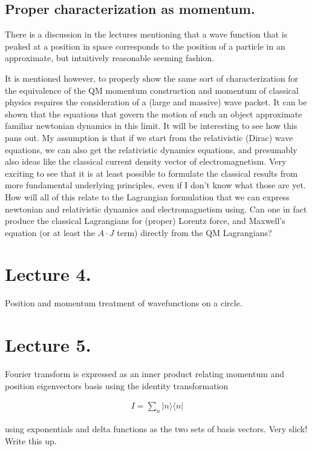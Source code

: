 \documentclass{article}
\newcommand{\ket}[1]{\lvert {#1} \rangle}
\newcommand{\bra}[1]{\langle {#1} \rvert}
\newcommand{\ketbra}[2]{\ket{#1}\bra{#2}}
\begin{document}
\subsection{ Proper characterization as momentum. }

There is a discussion in the lectures mentioning that a wave function that is peaked at a position in space
corresponds to the position of a particle in an approximate, but intuitively reasonable seeming fashion.

It is mentioned however, to properly show the same sort of characterization for the 
equivalence of the QM momentum construction and momentum of classical
physics requires the consideration of a (large and massive) wave packet.  It can be shown that the equations that
govern the motion
of such an object approximate familiar newtonian dynamics in this limit.  It will be interesting to see how
this pans out.  My assumption is that if we start from the relativistic (Dirac) wave equations, we can also
get the relativistic dynamics equations, and presumably also ideas like the classical current density vector
of electromagnetism.  Very exciting to see that it is at least possible to formulate the classical results from
more fundamental underlying principles, even if I don't know what those are yet.  How will all of this relate 
to the Lagrangian formulation that we can express newtonian and relativistic dynamics and electromagnetism using.
Can one in fact produce the classical Lagrangians for (proper) Lorentz force, and Maxwell's equation (or at least the $A \cdot J$ term) directly from the QM Lagrangians?

\section{ Lecture 4. }

Position and momentum treatment of wavefunctions on a circle. 

\section{ Lecture 5. }

Fourier transform is expressed as an inner product relating momentum and 
position eigenvectors basis using the identity transformation

\begin{align*}
I = \sum_n \ketbra{n}{n}
\end{align*}

using exponentials and delta functions as the two sets of basis vectors.  Very
slick!  Write this up.

%
%
\end{document}
